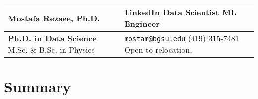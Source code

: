 \documentclass[a4paper,10pt]{article}
\newcommand{\largetext}{\fontsize{18}{22}\selectfont}
\begin{document}
\noindent

\begin{tabular}{@{}p{3.5in} p{3.5in}@{}}

    {\largetext\bfseries Mostafa Rezaee, Ph.D.} & \hfill \href{https://www.linkedin.com/in/mostafa-rezaee/}{LinkedIn} \textbar{} Data Scientist \textbar{} ML Engineer \\
    
    \hline 
    
    {\bfseries Ph.D. in Data Science} \textbar{} M.Sc. \& B.Sc. in Physics & \hfill \texttt{mostam@bgsu.edu} \textbar{} (419) 315-7481 \textbar{} Open to relocation.

\end{tabular}

\section*{Summary}
\end{document}
